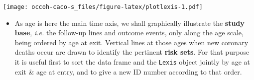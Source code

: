 \documentclass[
]{book}
\newenvironment{Shaded}{\begin{snugshade}}{\end{snugshade}}
\newcommand{\AttributeTok}[1]{\textcolor[rgb]{0.13,0.29,0.53}{#1}}
\newcommand{\ConstantTok}[1]{\textcolor[rgb]{0.56,0.35,0.01}{#1}}
\newcommand{\DecValTok}[1]{\textcolor[rgb]{0.00,0.00,0.81}{#1}}
\newcommand{\FunctionTok}[1]{\textcolor[rgb]{0.13,0.29,0.53}{\textbf{#1}}}
\newcommand{\NormalTok}[1]{#1}
\newcommand{\OtherTok}[1]{\textcolor[rgb]{0.56,0.35,0.01}{#1}}
\newcommand{\SpecialCharTok}[1]{\textcolor[rgb]{0.81,0.36,0.00}{\textbf{#1}}}
\providecommand{\tightlist}{%
  \setlength{\itemsep}{0pt}\setlength{\parskip}{0pt}}
\begin{document}
\begin{Shaded}
\end{Shaded}

\texttt{[image: occoh-caco-s\_files/figure-latex/plotlexis-1.pdf]}

\begin{itemize}
\tightlist
\item
  As age is here the main time axis,
  we shall graphically illustrate the \textbf{study base}, \emph{i.e.}
  the follow-up lines and outcome events,
  only along the age scale, being ordered by age at exit.
  Vertical lines at those ages when new coronary
  deaths occur are drawn to identify the pertinent
  \textbf{risk sets}. For that purpose it is useful first
  to sort the data frame and the \texttt{Lexis} object
  jointly by age at exit \& age at entry,
  and to give a new ID number according to that order.
\end{itemize}

\begin{Shaded}
\end{Shaded}
\end{document}
